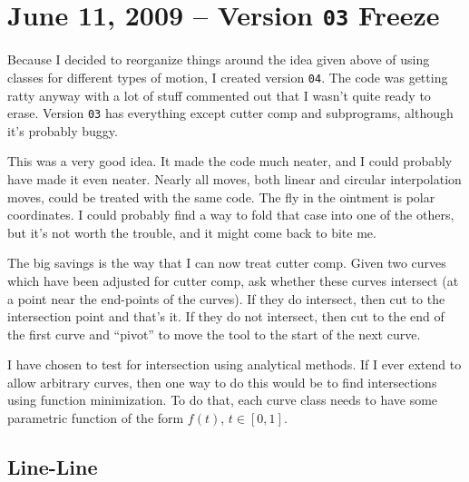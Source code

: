 \documentclass[titlepage,oneside,10pt]{article}
\begin{document}
\section{June 11, 2009 -- Version {\tt 03} Freeze}

Because I decided to reorganize things around the idea given above of
using classes for different types of motion, I created version 
{\tt 04}. The code was getting ratty anyway with a lot of stuff
commented out that I wasn't quite ready to erase. Version {\tt 03} has
everything except cutter comp and subprograms, although it's probably
buggy. 

This was a very good idea. It made the code much neater, and I could
probably have made it even neater. Nearly all moves, both
linear and circular interpolation moves, could be treated with the
same code. The fly in the ointment is polar coordinates. I could
probably find a way to fold that case into one of the others, but it's
not worth the trouble, and it might come back to bite me.

The big savings is the way that I can now treat cutter comp. Given two
curves which have been adjusted for cutter comp, ask whether these
curves intersect (at a point near the end-points of the curves). If
they do intersect, then cut to the intersection point and that's
it. If they do not intersect, then cut to the end of the first curve
and ``pivot'' to move the tool to the start of the next curve.

I have chosen to test for intersection using analytical methods. If I
ever extend to allow arbitrary curves, then one way to do this would
be to find intersections using function minimization. To do that, each
curve class needs to have some parametric function of the form $f(t)$,
$t\in[0,1]$. 

\subsection{Line-Line}
\end{document}

